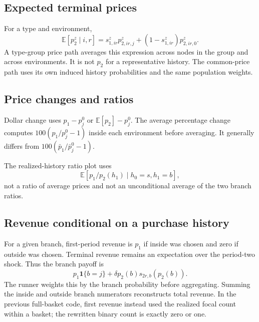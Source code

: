 \documentclass[11pt]{article}
\newcommand{\ind}{\mathbf{1}}
\newcommand{\E}{\mathbb{E}}
\begin{document}
\subsection{Expected terminal prices}
For a type and environment,
\[
 \E[p_2^z\mid i,r]=s^z_{1,ir}p^z_{2,ir,j}+(1-s^z_{1,ir})p^z_{2,ir,0}.
\]
A type-group price path averages this expression across nodes in the group and across environments. It is not $p_2$ for a representative history. The common-price path uses its own induced history probabilities and the same population weights.

\subsection{Price changes and ratios}
Dollar change uses $p_1-p^0_j$ or $\E[p_2]-p^0_j$. The average percentage change computes $100(p_1/p^0_j-1)$ inside each environment before averaging. It generally differs from $100(\bar p_1/\bar p^0_j-1)$.

The realized-history ratio plot uses
\[
 \E[p_1/p_2(h_1)\mid h_0=s,h_1=b],
\]
not a ratio of average prices and not an unconditional average of the two branch ratios.

\subsection{Revenue conditional on a purchase history}
For a given branch, first-period revenue is $p_1$ if inside was chosen and zero if outside was chosen. Terminal revenue remains an expectation over the period-two shock. Thus the branch payoff is
\[
 p_1\ind\{b=j\}+\delta p_2(b)s_{2r,b}(p_2(b)).
\]
The runner weights this by the branch probability before aggregating. Summing the inside and outside branch numerators reconstructs total revenue. In the previous full-basket code, first revenue instead used the realized focal count within a basket; the rewritten binary count is exactly zero or one.
\end{document}
